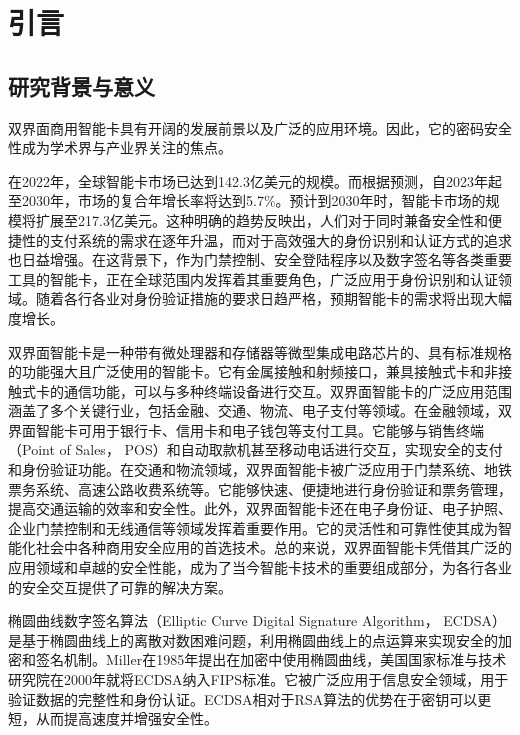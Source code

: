\chapter{引言}\label{chap:introduction}{
	\section{研究背景与意义}
	双界面商用智能卡具有开阔的发展前景以及广泛的应用环境。因此，它的密码安全性成为学术界与产业界关注的焦点。
	
	在2022年，全球智能卡市场已达到142.3亿美元的规模。而根据预测，自2023年起至2030年，市场的复合年增长率将达到5.7\%\citep{GVR-1-68038-464-2}。预计到2030年时，智能卡市场的规模将扩展至217.3亿美元。这种明确的趋势反映出，人们对于同时兼备安全性和便捷性的支付系统的需求在逐年升温，而对于高效强大的身份识别和认证方式的追求也日益增强。在这背景下，作为门禁控制、安全登陆程序以及数字签名等各类重要工具的智能卡，正在全球范围内发挥着其重要角色，广泛应用于身份识别和认证领域。随着各行各业对身份验证措施的要求日趋严格，预期智能卡的需求将出现大幅度增长。
	
	双界面智能卡是一种带有微处理器和存储器等微型集成电路芯片的、具有标准规格的功能强大且广泛使用的智能卡。它有金属接触和射频接口，兼具接触式卡和非接触式卡的通信功能，可以与多种终端设备进行交互。双界面智能卡的广泛应用范围涵盖了多个关键行业，包括金融、交通、物流、电子支付等领域。在金融领域，双界面智能卡可用于银行卡、信用卡和电子钱包等支付工具。它能够与销售终端（Point of Sales， POS）和自动取款机甚至移动电话进行交互，实现安全的支付和身份验证功能。在交通和物流领域，双界面智能卡被广泛应用于门禁系统、地铁票务系统、高速公路收费系统等。它能够快速、便捷地进行身份验证和票务管理，提高交通运输的效率和安全性。此外，双界面智能卡还在电子身份证、电子护照、企业门禁控制和无线通信等领域发挥着重要作用。它的灵活性和可靠性使其成为智能化社会中各种商用安全应用的首选技术。总的来说，双界面智能卡凭借其广泛的应用领域和卓越的安全性能，成为了当今智能卡技术的重要组成部分，为各行各业的安全交互提供了可靠的解决方案。
	
	椭圆曲线数字签名算法（Elliptic Curve Digital Signature Algorithm， ECDSA）是基于椭圆曲线上的离散对数困难问题，利用椭圆曲线上的点运算来实现安全的加密和签名机制。Miller\citep{Miller85}在1985年提出在加密中使用椭圆曲线，美国国家标准与技术研究院在2000年就将ECDSA纳入FIPS标准\citep{FIPS186-2}。它被广泛应用于信息安全领域，用于验证数据的完整性和身份认证。ECDSA相对于RSA算法的优势在于密钥可以更短，从而提高速度并增强安全性。
	
}
